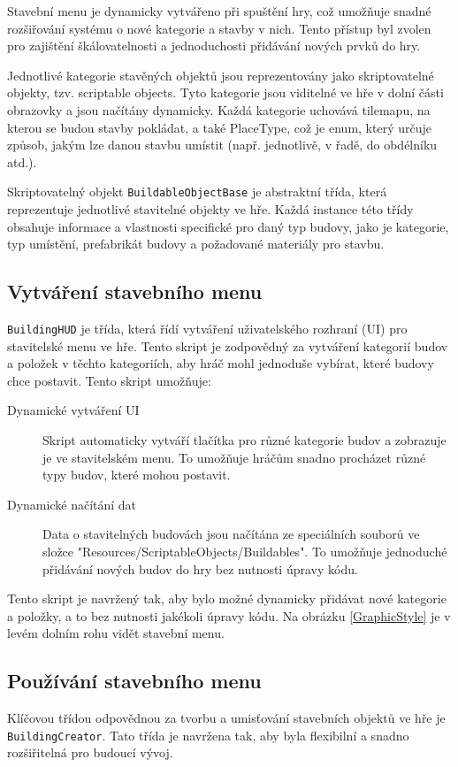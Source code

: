 Stavební menu je dynamicky vytvářeno při spuštění hry, což umožňuje snadné rozšiřování systému o nové kategorie a stavby v nich. Tento přístup byl zvolen pro zajištění škálovatelnosti a jednoduchosti přidávání nových prvků do hry.

Jednotlivé kategorie stavěných objektů jsou reprezentovány jako skriptovatelné objekty, tzv. scriptable objects. Tyto kategorie jsou viditelné ve hře v dolní části obrazovky a jsou načítány dynamicky. Každá kategorie uchovává tilemapu, na kterou se budou stavby pokládat, a také PlaceType, což je enum, který určuje způsob, jakým lze danou stavbu umístit (např. jednotlivě, v řadě, do obdélníku atd.).

Skriptovatelný objekt \texttt{BuildableObjectBase} je abstraktní třída, která reprezentuje jednotlivé stavitelné objekty ve hře. Každá instance této třídy obsahuje informace a vlastnosti specifické pro daný typ budovy, jako je kategorie, typ umístění, prefabrikát budovy a požadované materiály pro stavbu.

\subsection{Vytváření stavebního menu}
\texttt{BuildingHUD} je třída, která řídí vytváření uživatelského rozhraní (UI) pro stavitelské menu ve hře. Tento skript je zodpovědný za vytváření kategorií budov a položek v těchto kategoriích, aby hráč mohl jednoduše vybírat, které budovy chce postavit. Tento skript umožňuje:

\begin{description}
	\item[Dynamické vytváření UI] Skript automaticky vytváří tlačítka pro různé kategorie budov a zobrazuje je ve stavitelském menu. To umožňuje hráčům snadno procházet různé typy budov, které mohou postavit.
	\item[Dynamické načítání dat] Data o stavitelných budovách jsou načítána ze speciálních souborů ve složce "Resources/ScriptableObjects/Buildables". To umožňuje jednoduché přidávání nových budov do hry bez nutnosti úpravy kódu.
\end{description}

Tento skript je navržený tak, aby bylo možné dynamicky přidávat nové kategorie a položky, a to bez nutnosti jakékoli úpravy kódu. Na obrázku \ref{GraphicStyle} je v levém dolním rohu vidět stavební menu.

\subsection{Používání stavebního menu}
Klíčovou třídou odpovědnou za tvorbu a umisťování stavebních objektů ve hře je \newline \texttt{BuildingCreator}. Tato třída je navržena tak, aby byla flexibilní a snadno rozšiřitelná pro budoucí vývoj.

